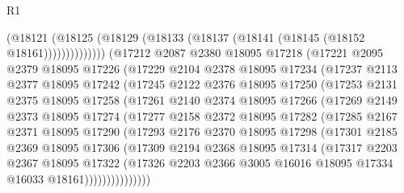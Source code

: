 \begin{lexlean}{R1}
\begin{coremodule}
                    (@18121
                      (@18125 (@18129 (@18133 (@18137 (@18141 (@18145 (@18152 @18161))))))))))))))
        (@17212
          @2087
          @2380
          @18095
          @17218
          (@17221
            @2095
            @2379
            @18095
            @17226
            (@17229
              @2104
              @2378
              @18095
              @17234
              (@17237
                @2113
                @2377
                @18095
                @17242
                (@17245
                  @2122
                  @2376
                  @18095
                  @17250
                  (@17253
                    @2131
                    @2375
                    @18095
                    @17258
                    (@17261
                      @2140
                      @2374
                      @18095
                      @17266
                      (@17269
                        @2149
                        @2373
                        @18095
                        @17274
                        (@17277
                          @2158
                          @2372
                          @18095
                          @17282
                          (@17285
                            @2167
                            @2371
                            @18095
                            @17290
                            (@17293
                              @2176
                              @2370
                              @18095
                              @17298
                              (@17301
                                @2185
                                @2369
                                @18095
                                @17306
                                (@17309
                                  @2194
                                  @2368
                                  @18095
                                  @17314
                                  (@17317
                                    @2203
                                    @2367
                                    @18095
                                    @17322
                                    (@17326
                                      @2203
                                      @2366
                                      @3005
                                      @16016
                                      @18095
                                      @17334
                                      @16033
                                      @18161)))))))))))))))

\end{coremodule}
\end{lexlean}
